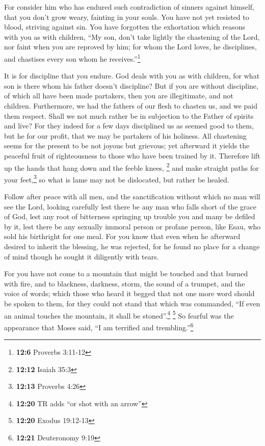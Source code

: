  For consider him who has endured such contradiction of
sinners against himself, that you don't grow weary, fainting in your
souls.  You have not yet resisted to blood, striving
against sin.  You have forgotten the exhortation which
reasons with you as with children, ``My son, don't take lightly the
chastening of the Lord, nor faint when you are reproved by him;
 for whom the Lord loves, he disciplines, and chastises
every son whom he receives.''\footnote{\textbf{12:6} Proverbs 3:11-12}

 It is for discipline that you endure. God deals with you
as with children, for what son is there whom his father doesn't
discipline?  But if you are without discipline, of which
all have been made partakers, then you are illegitimate, and not
children.  Furthermore, we had the fathers of our flesh to
chasten us, and we paid them respect. Shall we not much rather be in
subjection to the Father of spirits and live?  For they
indeed for a few days disciplined us as seemed good to them, but he for
our profit, that we may be partakers of his holiness. 
All chastening seems for the present to be not joyous but grievous; yet
afterward it yields the peaceful fruit of righteousness to those who
have been trained by it.  Therefore lift up the hands
that hang down and the feeble knees, \footnote{\textbf{12:12} Isaiah
  35:3}  and make straight paths for your
feet,\footnote{\textbf{12:13} Proverbs 4:26} so what is lame may not be
dislocated, but rather be healed.

 Follow after peace with all men, and the sanctification
without which no man will see the Lord,  looking
carefully lest there be any man who falls short of the grace of God,
lest any root of bitterness springing up trouble you and many be defiled
by it,  lest there be any sexually immoral person or
profane person, like Esau, who sold his birthright for one meal.
 For you know that even when he afterward desired to
inherit the blessing, he was rejected, for he found no place for a
change of mind though he sought it diligently with tears.

 For you have not come to a mountain that might be
touched and that burned with fire, and to blackness, darkness, storm,
 the sound of a trumpet, and the voice of words; which
those who heard it begged that not one more word should be spoken to
them,  for they could not stand that which was commanded,
``If even an animal touches the mountain, it shall be
stoned''.\footnote{\textbf{12:20} TR adds ``or shot with an arrow''}
\footnote{\textbf{12:20} Exodus 19:12-13}  So fearful was
the appearance that Moses said, ``I am terrified and
trembling.''\footnote{\textbf{12:21} Deuteronomy 9:19}

